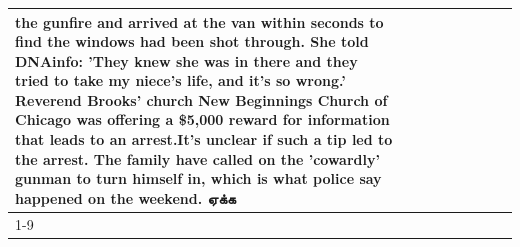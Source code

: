 \begin{table}[H]
\begin{tabular}{lllrlllll}
the gunfire and arrived at the van within seconds to find the windows had been shot through. She told DNAinfo: 'They knew she was in there and they tried to take my niece's life, and it's so wrong.' Reverend Brooks' church New Beginnings Church of Chicago was offering a \$5,000 reward for information that leads to an arrest.It's unclear if such a tip led to the arrest. The family have called on the 'cowardly' gunman to turn himself in, which is what police say happened on the weekend. ஏக்க \\
\cline{1-9}
\bottomrule
\end{tabular}
\end{table}
